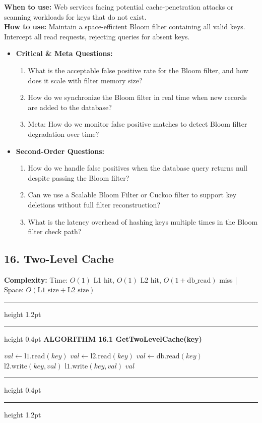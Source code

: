 \documentclass[11pt,a4paper]{article}
\newenvironment{textbookalgo}[2]{%
  \par\addvspace{1.2em}\noindent
  \hrule height 1.2pt
  \vspace{1.5pt}
  \hrule height 0.4pt
  \vspace{5pt}
  {\noindent\large\bfseries\sffamily ALGORITHM #1 \quad #2}
  \par\vspace{5pt}
  \RestyleAlgo{plain}
}{%
  \par\vspace{4pt}
  \hrule height 0.4pt
  \vspace{1.5pt}
  \hrule height 1.2pt
  \par\addvspace{1.2em}
}
\theoremstyle{definition}
\begin{document}
\noindent
\textbf{When to use:} Web services facing potential cache-penetration attacks or scanning workloads for keys that do not exist.\\
\textbf{How to use:} Maintain a space-efficient Bloom filter containing all valid keys. Intercept all read requests, rejecting queries for absent keys.
\begin{itemize}[leftmargin=*]
  \item[] \textbf{Critical \& Meta Questions:}
  \begin{enumerate}
  \item What is the acceptable false positive rate for the Bloom filter, and how does it scale with filter memory size?
  \item How do we synchronize the Bloom filter in real time when new records are added to the database?
  \item Meta: How do we monitor false positive matches to detect Bloom filter degradation over time?
  \end{enumerate}
  \item[] \textbf{Second-Order Questions:}
  \begin{enumerate}
  \item How do we handle false positives when the database query returns null despite passing the Bloom filter?
  \item Can we use a Scalable Bloom Filter or Cuckoo filter to support key deletions without full filter reconstruction?
  \item What is the latency overhead of hashing keys multiple times in the Bloom filter check path?
  \end{enumerate}
\end{itemize}
\medskip

\clearpage
\subsection{16. Two-Level Cache}

\noindent
\textbf{Complexity:} Time: $O(1)$ L1 hit, $O(1)$ L2 hit, $O(1 + \text{db\_read})$ miss | Space: $O(\text{L1\_size} + \text{L2\_size})$
\smallskip

\begin{textbookalgo}{16.1}{GetTwoLevelCache(key)}
\begin{algorithm}[H]
$val \leftarrow \text{l1.read}(key)$\;
$val \leftarrow \text{l2.read}(key)$\;
$val \leftarrow \text{db.read}(key)$\;
$\text{l2.write}(key, val)$\;
$\text{l1.write}(key, val)$\;
\Return $val$\;
\end{algorithm}
\end{textbookalgo}
\end{document}
